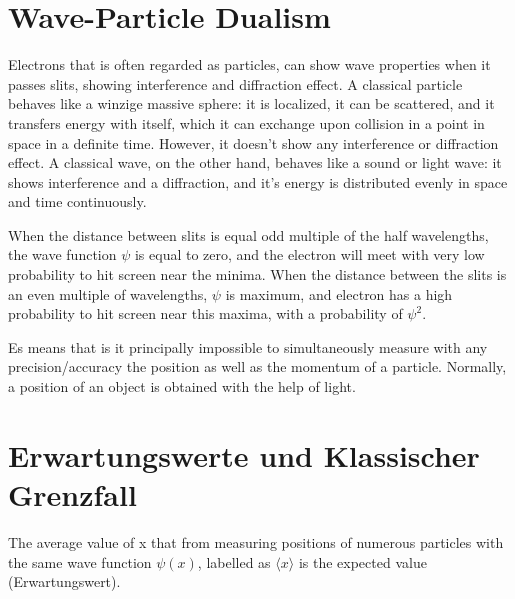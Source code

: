 \documentclass{report}
\begin{document}

\section{Wave-Particle Dualism}
Electrons that is often regarded as particles, can show wave properties when it passes slits, showing interference and diffraction effect. A classical particle behaves like a winzige massive sphere: it is localized, it can be scattered, and it transfers energy with itself, which it can exchange upon collision in a point in space in a definite time. However, it doesn't show any interference or diffraction effect. A classical wave, on the other hand, behaves like a sound or light wave: it shows interference and a diffraction, and it's energy is distributed evenly in space and time continuously. 


When the distance between slits is equal odd multiple of the half wavelengths, the wave function $\psi$ is equal to zero, and the electron will meet with very low probability to hit screen near the minima. When the distance between the slits is an even multiple of wavelengths, $\psi$ is maximum, and electron has a high probability to hit screen near this maxima, with a probability of $\psi^2$.


Es means that is it principally impossible to simultaneously measure with any precision/accuracy the position as well as the momentum of a particle. Normally, a position of an object is obtained with the help of light. 


\section{Erwartungswerte und Klassischer Grenzfall}
The average value of x that from measuring positions of numerous particles with the same wave function $\psi (x)$, labelled as $\langle x \rangle$ is the expected value (Erwartungswert).
\end{document}
